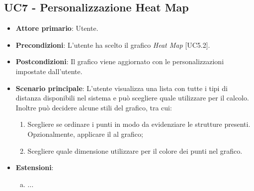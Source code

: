 \subsection{UC7 - Personalizzazione Heat Map}
\begin{itemize}
	\item \textbf{Attore primario}: Utente.
	
	\item \textbf{Precondizioni}: L'utente ha scelto il grafico \textit{Heat Map} [UC5.2].
	
	\item \textbf{Postcondizioni}: Il grafico viene aggiornato con le personalizzazioni impostate dall'utente.
	
	\item \textbf{Scenario principale}: L'utente visualizza una lista con tutte i tipi di distanza disponibili nel sistema e può scegliere quale utilizzare per il calcolo. Inoltre può decidere alcune stili del grafico, tra cui:
		\begin{enumerate}
			\item Scegliere se ordinare i punti in modo da evidenziare le strutture presenti. Opzionalmente, applicare il  al grafico;
				
			\item Scegliere quale dimensione utilizzare per il colore dei punti nel grafico.
				
		\end{enumerate}
		
		\item \textbf{Estensioni}:
	\begin{enumerate}[(a)]
		\item ...
	\end{enumerate}
\end{itemize}
